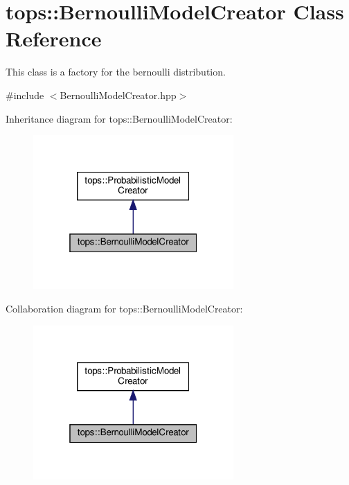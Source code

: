 \hypertarget{classtops_1_1BernoulliModelCreator}{}\section{tops\+:\+:Bernoulli\+Model\+Creator Class Reference}
\label{classtops_1_1BernoulliModelCreator}


This class is a factory for the bernoulli distribution.  




{\ttfamily \#include $<$Bernoulli\+Model\+Creator.\+hpp$>$}



Inheritance diagram for tops\+:\+:Bernoulli\+Model\+Creator\+:
\nopagebreak
\begin{figure}[H]
\begin{center}
\leavevmode
\includegraphics[width=217pt]{classtops_1_1BernoulliModelCreator__inherit__graph}
\end{center}
\end{figure}


Collaboration diagram for tops\+:\+:Bernoulli\+Model\+Creator\+:
\nopagebreak
\begin{figure}[H]
\begin{center}
\leavevmode
\includegraphics[width=217pt]{classtops_1_1BernoulliModelCreator__coll__graph}
\end{center}
\end{figure}
